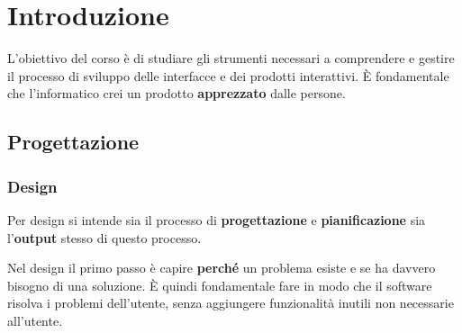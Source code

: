 \newpage
\section{Introduzione}
L'obiettivo del corso è di studiare gli strumenti necessari a comprendere e gestire il processo di sviluppo delle interfacce e dei prodotti interattivi. È fondamentale che l'informatico crei un prodotto \textbf{apprezzato} dalle persone.

\subsection{Progettazione}
\subsubsection{Design}
\begin{definition}[Design]
	Per design si intende sia il processo di \textbf{progettazione} e \textbf{pianificazione} sia l'\textbf{output} stesso di questo processo.
\end{definition}
Nel design il primo passo è capire \textbf{perché} un problema esiste e se ha davvero bisogno di una soluzione. È quindi fondamentale fare in modo che il software risolva i problemi dell'utente, senza aggiungere funzionalità inutili non necessarie all'utente.\\

